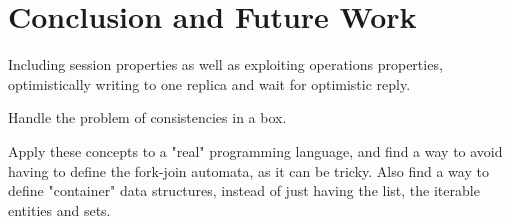 
\section{Conclusion and Future Work}

Including session properties as well as exploiting operations properties, optimistically writing to one replica and wait for 
optimistic reply.

Handle the problem of consistencies in a box.

Apply these concepts to a "real" programming language, and find a way to avoid
having to define the fork-join automata, as it can be tricky. Also find a way to
define "container" data structures, instead of just having the list, the
iterable entities and sets.
